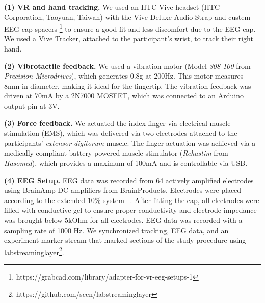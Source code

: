 \textbf{(1) VR and hand tracking.} We used an HTC Vive headset (HTC Corporation, Taoyuan, Taiwan) with the Vive Deluxe Audio Strap and custem EEG cap spacers \footnote{https://grabcad.com/library/adapter-for-vr-eeg-setups-1} to ensure a good fit and less discomfort due to the EEG cap. We used a Vive Tracker, attached to the participant's wrist, to track their right hand. 

\textbf{(2) Vibrotactile feedback.} We used a vibration motor (Model \textit{308-100} from \textit{Precision Microdrives}), which generates 0.8g at 200Hz. This motor measures 8mm in diameter, making it ideal for the fingertip. The vibration feedback was driven at 70mA by a 2N7000 MOSFET, which was connected to an Arduino output pin at 3V.

\textbf{(3) Force feedback.} We actuated the index finger via electrical muscle stimulation (EMS), which was delivered via two electrodes attached to the participants' \textit{extensor digitorum} muscle. The finger actuation was achieved via a medically-compliant battery powered muscle stimulator (\textit{Rehastim} from \textit{Hasomed}), which provides a maximum of 100mA and is controllable via USB. 


\textbf{(4) EEG Setup.} EEG data was recorded from 64 actively amplified electrodes using BrainAmp DC amplifiers from BrainProducts. Electrodes were placed according to the extended 10\% system ~\cite{oostenveld_five_2001}. After fitting the cap, all electrodes were filled with conductive gel to ensure proper conductivity and electrode impedance was brought below 5kOhm for all electrodes. EEG data was recorded with a sampling rate of 1000 Hz. We synchronized tracking, EEG data, and an experiment marker stream that marked sections of the study procedure using labstreaminglayer\footnote{https://github.com/sccn/labstreaminglayer}.

